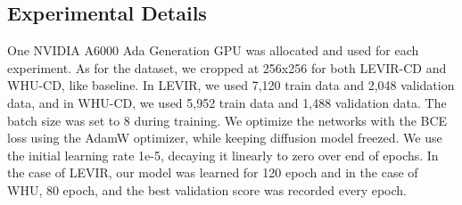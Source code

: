 \documentclass[../main.tex]{subfiles}
\begin{document}
\subsection{Experimental Details}
One NVIDIA A6000 Ada Generation GPU was allocated and used for each experiment. As for the dataset, we cropped at 256x256 for both LEVIR-CD and WHU-CD, like baseline. In LEVIR, we used 7,120 train data and 2,048 validation data, and in WHU-CD, we used 5,952 train data and 1,488 validation data. The batch size was set to 8 during training. We optimize the networks with the BCE loss using the AdamW optimizer, while keeping diffusion model freezed. We use the initial learning rate 1e-5,  decaying it linearly to zero over end of epochs. In the case of LEVIR, our model was learned for 120 epoch and in the case of WHU, 80 epoch, and the best validation score was recorded every epoch. 
\end{document}
